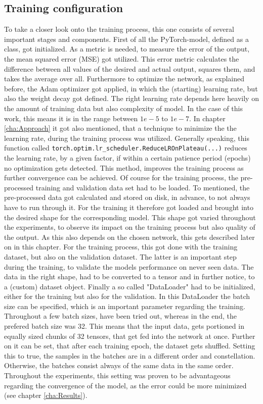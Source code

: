 \subsection{Training configuration}
To take a closer look onto the training process, this one consists of several important stages and components. First of all the PyTorch-model, defined as a class, got initialized. As a metric is needed, to measure the error of the output, the mean squared error (MSE) got utilized. This error metric calculates the difference between all values of the desired and actual output, squares them, and takes the average over all. Furthermore to optimize the network, as explained before, the Adam optimizer got applied, in which the (starting) learning rate, but also the weight decay got defined. The right learning rate depends here heavily on the amount of training data but also complexity of model. In the case of this work, this means it is in the range between $1e-5$ to $1e-7$. In chapter \ref{cha:Approach} it got also mentioned, that a technique to minimize the the learning rate, during the training process was utilized. Generally speaking, this function called \texttt{torch.optim.lr\_scheduler.ReduceLROnPlateau(...)} reduces the learning rate, by a given factor, if within a certain patience period (epochs) no optimization gets detected. This method, improves the training process as further convergence can be achieved. Of course for the training process, the pre-processed training and validation data set had to be loaded. To mentioned, the pre-processed data got calculated and stored on disk, in advance, to not always have to run through it. For the training it therefore got loaded and brought into the desired shape for the corresponding model. This shape got varied throughout the experiments, to observe its impact on the training process but also quality of the output. As this also depends on the chosen network, this gets described later on in this chapter. For the training process, this got done with the training dataset, but also on the validation dataset. The latter is an important step during the training, to validate the models performance on never seen data.
The data in the right shape, had to be converted to a tensor and in further notice, to a (custom) dataset object. Finally a so called "DataLoader" had to be initialized, either for the training but also for the validation. In this DataLoader the batch size can be specified, which is an important parameter regarding the training. Throughout a few batch sizes, have been tried out, whereas in the end, the prefered batch size was 32. This means that the input data, gets portioned in equally sized chunks of 32 tensors, that get fed into the network at once. Further on it can be set, that after each training epoch, the dataset gets shuffled. Setting this to true, the samples in the batches are in a different order and constellation. Otherwise, the batches consist always of the same data in the same order. Throughout the experiments, this setting was proven to be advantageous regarding the convergence of the model, as the error could be more minimized (see chapter \ref{cha:Results}).

